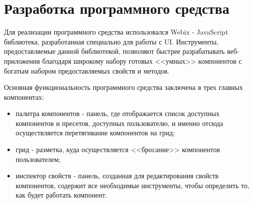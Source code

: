 \section{Разработка программного средства} 
\label{sec:development}

Для реализации программного средства использовался Webix - JavaScript библиотека, разработанная специально для работы с UI. Инструменты, предоставляемые данной библиотекой, позволяют быстрее разрабатывать веб-приложения благодаря широкому набору готовых <<умных>> компонентов с богатым набором предоставляемых свойств и методов.

Основная функциональность программного средства заключена в трех главных компонентах: 
\begin{itemize}
	\item палитра компонентов - панель, где отображается список доступных компонентов и пресетов, доступных пользователю, и именно отсюда осуществляется перетягивание компонентов на грид;
	\item грид - разметка, куда осуществляется <<бросание>> компонентов пользователем;
	\item инспектор свойств - панель, созданная для редактирования свойств компонентов, содержит все необходимые инструменты, чтобы определить то, как будет работать компонент.
\end{itemize}


